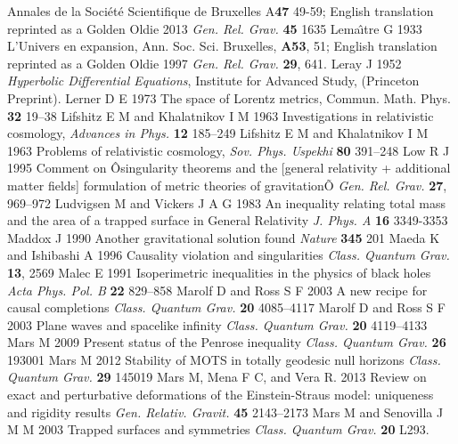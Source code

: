 \documentclass[12pt]{iopart}
\begin{document}
\begin{thebibliography}{999}
{Annales de la Soci\'et\'e Scientifique de Bruxelles} A{\bf 47} 49-59; English translation reprinted as a Golden Oldie 2013 {\it Gen. Rel. Grav.} {\bf 45} 1635%
 Lema\^{\i}tre G 1933 L'Univers en expansion, Ann. Soc. Sci. Bruxelles, {\bf A53}, 51; English translation reprinted as a Golden Oldie 1997 {\it Gen. Rel. Grav.} {\bf 29}, 641.
 Leray J 1952 {\it Hyperbolic Differential Equations},
Institute for Advanced Study, (Princeton Preprint).%
 Lerner D E 1973 The space of Lorentz metrics, Commun. Math. Phys. {\bf 32} 19--38
 Lifshitz E M and Khalatnikov I M 1963 Investigations in relativistic cosmology, {\it Advances in Phys.} {\bf 12} 185--249
 Lifshitz E M and Khalatnikov I M 1963 Problems of relativistic cosmology, {\it Sov. Phys. Uspekhi} {\bf 80} 391--248
 Low R J 1995 Comment on Ôsingularity theorems and the [general relativity + additional matter fields] formulation of metric theories of gravitationÕ {\it Gen. Rel. Grav.} {\bf 27}, 969--972%
 Ludvigsen M and Vickers J A G 1983 An inequality relating total mass and the area of a trapped surface in General Relativity {\it J. Phys. A} {\bf 16} 3349-3353
 Maddox J 1990 Another gravitational 
solution found {\it Nature} {\bf 345} 201
 Maeda K and Ishibashi A 1996 Causality violation and singularities {\it Class. Quantum Grav.} {\bf 13},
2569%
 Malec E 1991 Isoperimetric inequalities in the physics of black holes {\it Acta Phys. Pol. B} {\bf 22} 829--858
 Marolf D and Ross S F 2003 A new recipe for causal completions {\it Class. Quantum Grav.} {\bf 20} 4085--4117
 Marolf D and Ross S F 2003 Plane waves and spacelike infinity {\it Class. Quantum Grav.} {\bf 20} 4119--4133
 Mars M 2009 Present status of the Penrose inequality {\it Class. Quantum Grav.} {\bf 26} 193001
 Mars M 2012 Stability of MOTS in totally geodesic null horizons {\it Class. Quantum Grav.} {\bf 29} 145019
 Mars M, Mena F C, and Vera R. 2013 Review on exact and perturbative deformations
of the Einstein-Straus model: uniqueness and rigidity results {\it Gen. Relativ. Gravit.} {\bf 45} 2143--2173
 Mars M and Senovilla J M M 2003 Trapped surfaces and symmetries {\it Class. Quantum Grav.}  {\bf 20} L293.

\end{thebibliography}
\end{document}
